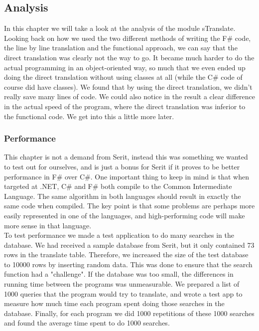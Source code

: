 \documentclass[12pt, a4paper]{article}
\begin{document}
\newpage


\subsection{Analysis}
In this chapter we will take a look at the analysis of the module sTranslate.
Looking back on how we used the two different methods of writing the F\# code, the line by line translation and the functional approach, we can say that the direct translation was clearly not the way to go. It became much harder to do the actual programming in an object-oriented way, so much that we even ended up doing the direct translation without using classes at all (while the C\# code of course did have classes). We found that by using the direct translation, we didn't really save many lines of code. We could also notice in the result a clear difference in the actual speed of the program, where the direct translation was inferior to the functional code. We get into this a little more later.

\subsubsection{Performance}
\label{sTranslatePerformance}
This chapter is not a demand from Serit, instead this was something we wanted to test out for ourselves, and is just a bonus for Serit if it proves to be better performance in F\# over C\#. One important thing to keep in mind is that when targeted at .NET, C\# and F\# both compile to the Common Intermediate Language. The same algorithm in both languages should result in exactly the same code when compiled. The key point is that some problems are perhaps more easily represented in one of the languages, and high-performing code will make more sense in that language.\\

To test performance we made a test application to do many searches in the database. We had received a sample database from Serit, but it only contained 73 rows in the translate table. Therefore, we increased the size of the test database to 10000 rows by inserting random data. This was done to ensure that the search function had a "challenge". If the database was too small, the differences in running time between the programs was unmeasurable. We prepared a list of 1000 queries that the program would try to translate, and wrote a test app to measure how much time each program spent doing those searches in the database. Finally, for each program we did 1000 repetitions of these 1000 searches and found the average time spent to do 1000 searches.\\
\end{document}
